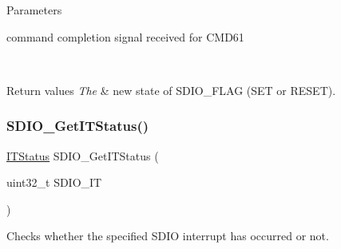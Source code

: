 \begin{DoxyParams}{Parameters}
\begin{DoxyItemize}
command completion signal received for C\+M\+D61 \end{DoxyItemize}
\\
\hline
\end{DoxyParams}

\begin{DoxyRetVals}{Return values}
{\em The} & new state of S\+D\+I\+O\+\_\+\+F\+L\+AG (S\+ET or R\+E\+S\+ET). \\
\hline
\end{DoxyRetVals}
\mbox{\label{group___s_d_i_o___private___functions_ga2d64af1f3df0f99cb518f9a89bbd02ac}} 
\subsubsection{\texorpdfstring{SDIO\_GetITStatus()}{SDIO\_GetITStatus()}}
{\footnotesize\ttfamily \mbox{\hyperlink{group___exported__types_gaacbd7ed539db0aacd973a0f6eca34074}{I\+T\+Status}} S\+D\+I\+O\+\_\+\+Get\+I\+T\+Status (\begin{DoxyParamCaption}\item[{uint32\+\_\+t}]{S\+D\+I\+O\+\_\+\+IT }\end{DoxyParamCaption})}



Checks whether the specified S\+D\+IO interrupt has occurred or not. 


